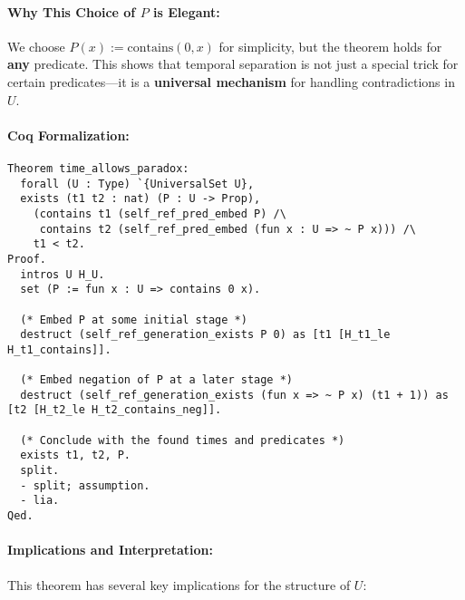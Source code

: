 \documentclass[12pt]{article}
\begin{document}
\paragraph{Why This Choice of \( P \) is Elegant:}
We choose \( P(x) := \text{contains}(0, x) \) for simplicity, but the theorem holds for \textbf{any} predicate. This shows that temporal separation is not just a special trick for certain predicates—it is a \textbf{universal mechanism} for handling contradictions in \( U \).

\paragraph{Coq Formalization:}
\begin{lstlisting}[language=Coq]
Theorem time_allows_paradox:
  forall (U : Type) `{UniversalSet U},
  exists (t1 t2 : nat) (P : U -> Prop),
    (contains t1 (self_ref_pred_embed P) /\
     contains t2 (self_ref_pred_embed (fun x : U => ~ P x))) /\
    t1 < t2.
Proof.
  intros U H_U.
  set (P := fun x : U => contains 0 x).

  (* Embed P at some initial stage *)
  destruct (self_ref_generation_exists P 0) as [t1 [H_t1_le H_t1_contains]].

  (* Embed negation of P at a later stage *)
  destruct (self_ref_generation_exists (fun x => ~ P x) (t1 + 1)) as [t2 [H_t2_le H_t2_contains_neg]].

  (* Conclude with the found times and predicates *)
  exists t1, t2, P.
  split.
  - split; assumption.
  - lia.
Qed.
\end{lstlisting}

\paragraph{Implications and Interpretation:}
This theorem has several key implications for the structure of \( U \):
\end{document}
